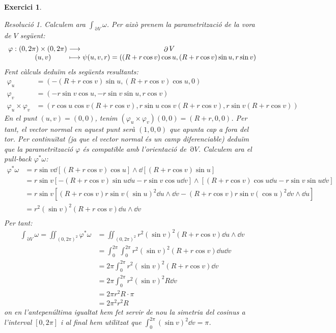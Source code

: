 \documentclass[10pt,a4paper]{article}
\makeatletter
\newcommand{\function}[5]{
  \if\relax\detokenize{#1}\relax %
  \begin{array}{c@{\hspace{0.5\tabcolsep}}c@{\hspace{0.5\tabcolsep}}c}
    #2 & \longrightarrow & #3                     \\
    #4 & \longmapsto     & #5
  \end{array}
  \else %
  \begin{array}{r@{\hspace{0.5\tabcolsep}}c@{\hspace{0.5\tabcolsep}}c@{\hspace{0.5\tabcolsep}}c}
    #1: & #2 & \longrightarrow & #3                     \\
        & #4 & \longmapsto     & #5
  \end{array}
  \fi
} %
\newtheorem{exercice}{Exercici}
\theoremstyle{remark}
\newtheorem*{resolution}{Resolució}
\theoremstyle{math}
\DeclareMathOperator{\Fr}{\partial} %
\makeatother
\begin{document}
\begin{exercice}
\begin{resolution}
    Calculem ara $\int_{\Fr{V}}\omega$. Per això prenem la parametrització de la vora de $V$ següent:
    $$\function{\varphi}{(0,2\pi)\times(0,2\pi)}{\Fr{V}}{(u,v)}{\psi(u,v,r)=((R+r\cos v)\cos u,(R+r\cos v)\sin u,r\sin v)}$$
    Fent càlculs deduïm els següents resultants:
    \begin{align*}
      \varphi_u                & =\left(-(R+r\cos v)\sin u,(R+r\cos v)\cos u,0\right)                               \\
      \varphi_v                & =\left(-r\sin v\cos u,-r\sin v\sin u,r\cos v\right)                                \\
      \varphi_u\times\varphi_v & =\left(r\cos u\cos v(R+r\cos v),r\sin u\cos v(R+r\cos v),r\sin v(R+r\cos v)\right)
    \end{align*}
    En el punt $(u,v)=(0,0)$, tenim $(\varphi_u\times\varphi_v)(0,0)=(R+r,0,0)$. Per tant, el vector normal en aquest punt serà $(1,0,0)$ que apunta cap a fora del tor. Per continuïtat (ja que el vector normal és un camp diferenciable) deduïm que la parametrització $\varphi$ és compatible amb l'orientació de $\Fr{V}$. Calculem ara el pull-back $\varphi^*\omega$:
    \begin{align*}
      \varphi^*\omega & =r\sin v\dd{[(R+r\cos v)\cos u]}\wedge\dd{[(R+r\cos v)\sin u]}                                              \\
                      & =r\sin v[-(R+r\cos v)\sin u\dd{u}-r\sin v\cos u\dd{v}]\wedge[(R+r\cos v)\cos u\dd{u}-r\sin v\sin u\dd{v}]   \\
                      & =r\sin v[(R+r\cos v)r\sin v{(\sin u)}^2\dd{u}\wedge\dd{v}-(R+r\cos v)r\sin v{(\cos u)}^2\dd{v}\wedge\dd{u}] \\
                      & =r^2{(\sin v)}^2(R+r\cos v)\dd{u}\wedge\dd{v}                                                               \\
    \end{align*}
    Per tant:
    \begin{align*}
      \int_{\Fr{V}}\omega =\iint_{{(0,2\pi)}^2}\varphi^*\omega & =\iint_{{(0,2\pi)}^2}r^2{(\sin v)}^2(R+r\cos v)\dd{u}\wedge\dd{v} \\
                                                               & =\int_0^{2\pi}\int_0^{2\pi}r^2{(\sin v)}^2(R+r\cos v)\dd{u}\dd{v} \\
                                                               & =2\pi\int_0^{2\pi}r^2{(\sin v)}^2(R+r\cos v)\dd{v}                \\
                                                               & =2\pi\int_0^{2\pi}r^2{(\sin v)}^2R\dd{v}                          \\
                                                               & =2\pi r^2R\cdot \pi                                               \\
                                                               & = 2\pi^2 r^2R
    \end{align*}
    on en l'antepenúltima igualtat hem fet servir de nou la simetria del cosinus a l'interval $[0,2\pi]$ i al final hem utilitzat que $\int_0^{2\pi}{(\sin v)}^2\dd{v}=\pi$.


\end{resolution}
\end{exercice}
\end{document}

